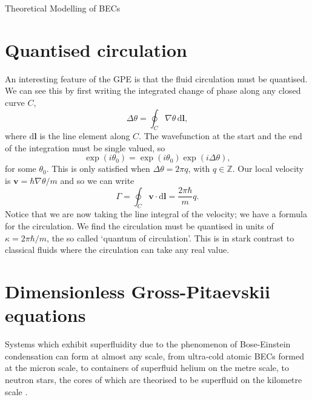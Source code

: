 \begin{chapter}{\label{cha:theoretical_model}Theoretical Modelling of BECs}
\section{\label{section:quantisedcirculation} Quantised circulation}
An interesting feature of the GPE is that the fluid circulation must be quantised. We can see this by first writing the integrated change of phase along any closed curve $C$,
\begin{equation}
	\Delta\theta = \oint_C \! \nabla \theta  \, \mathrm{d}\mathbf{l},
\end{equation}
where $\mathrm{d}\mathbf{l}$ is the line element along $C$. The wavefunction at the start and the end of the integration must be single valued, so
\begin{equation}
	\exp (i\theta_0) = \exp (i\theta_0)\exp (i\Delta\theta),
\end{equation}
for some $\theta_0$. This is only satisfied when $\Delta\theta = 2\pi q$, with $q\in\mathbb{Z}$. Our local velocity is $\mathbf{v} = \hbar\nabla\theta/m $ and so we can write
\begin{equation}
	\Gamma = \oint_C \! \mathbf{v} \cdot \mathrm{d}\mathbf{l} = \frac{2 \pi \hbar}{m}q.
\end{equation}
Notice that we are now taking the line integral of the velocity; we have a formula for the circulation. We find the circulation must be quantised in units of $\kappa = 2 \pi \hbar/m$, the so called `quantum of circulation'. This is in stark contrast to classical fluids where the circulation can take any real value.

\section{\label{section:gpedimless} Dimensionless Gross-Pitaevskii equations}
	Systems which exhibit superfluidity due to the phenomenon of Bose-Einstein condensation can form at almost any scale, from ultra-cold atomic BECs formed at the micron scale, %
	to containers of superfluid helium on the metre scale, to neutron stars, the cores of which are theorised to be superfluid on the kilometre scale \cite{Warszawski01082011}.


\end{chapter}
